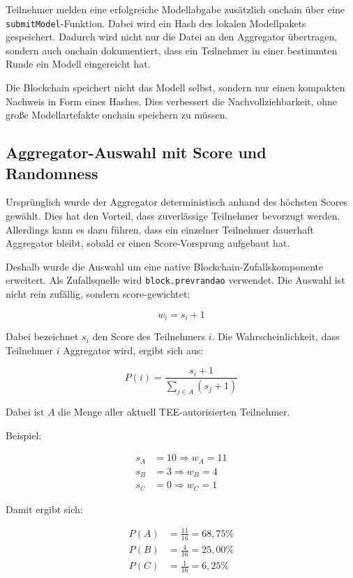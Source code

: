Teilnehmer melden eine erfolgreiche Modellabgabe zusätzlich onchain über eine \texttt{submitModel}-Funktion. Dabei wird ein Hash des lokalen Modellpakets gespeichert. Dadurch wird nicht nur die Datei an den Aggregator übertragen, sondern auch onchain dokumentiert, dass ein Teilnehmer in einer bestimmten Runde ein Modell eingereicht hat.

Die Blockchain speichert nicht das Modell selbst, sondern nur einen kompakten Nachweis in Form eines Hashes. Dies verbessert die Nachvollziehbarkeit, ohne große Modellartefakte onchain speichern zu müssen.

\subsection{Aggregator-Auswahl mit Score und Randomness}

Ursprünglich wurde der Aggregator deterministisch anhand des höchsten Scores gewählt. Dies hat den Vorteil, dass zuverlässige Teilnehmer bevorzugt werden. Allerdings kann es dazu führen, dass ein einzelner Teilnehmer dauerhaft Aggregator bleibt, sobald er einen Score-Vorsprung aufgebaut hat.

Deshalb wurde die Auswahl um eine native Blockchain-Zufallskomponente erweitert. Als Zufallsquelle wird \texttt{block.prevrandao} verwendet. Die Auswahl ist nicht rein zufällig, sondern score-gewichtet:

\begin{equation}
w_i = s_i + 1
\end{equation}

Dabei bezeichnet \(s_i\) den Score des Teilnehmers \(i\). Die Wahrscheinlichkeit, dass Teilnehmer \(i\) Aggregator wird, ergibt sich aus:

\begin{equation}
P(i) = \frac{s_i + 1}{\sum_{j \in A}(s_j + 1)}
\end{equation}

Dabei ist \(A\) die Menge aller aktuell TEE-autorisierten Teilnehmer.

Beispiel:

\begin{align}
s_A &= 10 \Rightarrow w_A = 11 \\
s_B &= 3  \Rightarrow w_B = 4 \\
s_C &= 0  \Rightarrow w_C = 1
\end{align}

Damit ergibt sich:

\begin{align}
P(A) &= \frac{11}{16} = 68{,}75\% \\
P(B) &= \frac{4}{16} = 25{,}00\% \\
P(C) &= \frac{1}{16} = 6{,}25\%
\end{align}

